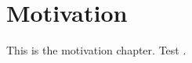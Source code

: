 \chapter[Motivation]{Motivation}

This is the motivation chapter. Test \cite{Gherardi_2020} \cite{PhysRevLett.114.101802}.
